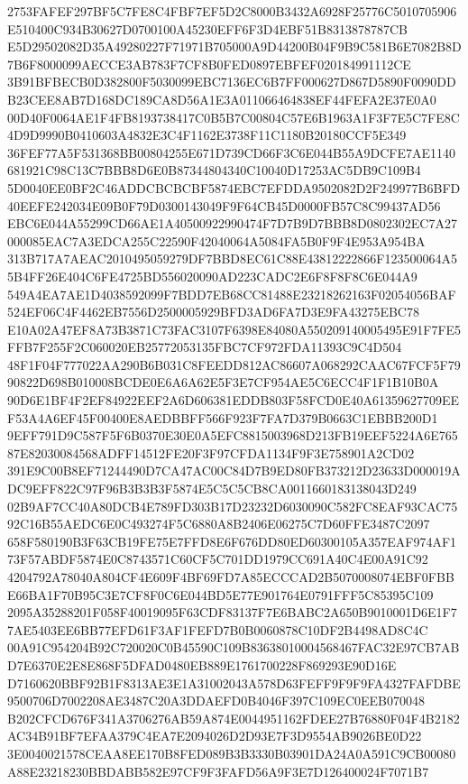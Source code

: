 \documentclass[UTF8,fontset=fandol,zihao=-4,a4paper]{ctexart}
\begin{document}
{{2753FAFEF297BF5C7FE8C4FBF7EF5D2C8000B3432A6928F25776C5010705906E510400C934B30627D0700100A45230EFF6F3D4EBF51B8313878787CB
E5D29502082D35A49280227F71971B705000A9D44200B04F9B9C581B6E7082B8D7B6F8000099AECCE3AB783F7CF8B0FED0897EBFEF020184991112CE
3B91BFBECB0D382800F5030099EBC7136EC6B7FF000627D867D5890F0090DDB23CEE8AB7D168DC189CA8D56A1E3A011066464838EF44FEFA2E37E0A0
00D40F0064AE1F4FB8193738417C0B5B7C00804C57E6B1963A1F3F7E5C7FE8C4D9D9990B0410603A4832E3C4F1162E3738F11C1180B20180CCF5E349
36FEF77A5F531368BB00804255E671D739CD66F3C6E044B55A9DCFE7AE1140681921C98C13C7BBB8D6E0B87344804340C10040D17253AC5DB9C109B4
5D0040EE0BF2C46ADDCBCBCBF5874EBC7EFDDA9502082D2F249977B6BFD40EEFE242034E09B0F79D0300143049F9F64CB45D0000FB57C8C99437AD56
EBC6E044A55299CD66AE1A40500922990474F7D7B9D7BBB8D0802302EC7A27000085EAC7A3EDCA255C22590F42040064A5084FA5B0F9F4E953A954BA
313B717A7AEAC2010495059279DF7BBD8EC61C88E43812222866F123500064A55B4FF26E404C6FE4725BD556020090AD223CADC2E6F8F8F8C6E044A9
549A4EA7AE1D4038592099F7BDD7EB68CC81488E23218262163F02054056BAF524EF06C4F4462EB7556D2500005929BFD3AD6FA7D3E9FA43275EBC78
E10A02A47EF8A73B3871C73FAC3107F6398E84080A550209140005495E91F7FE5FFB7F255F2C060020EB25772053135FBC7CF972FDA11393C9C4D504
48F1F04F777022AA290B6B031C8FEEDD812AC86607A068292CAAC67FCF5F7990822D698B010008BCDE0E6A6A62E5F3E7CF954AE5C6ECC4F1F1B10B0A
90D6E1BF4F2EF84922EEF2A6D606381EDDB803F58FCD0E40A61359627709EEF53A4A6EF45F00400E8AEDBBFF566F923F7FA7D379B0663C1EBBB200D1
9EFF791D9C587F5F6B0370E30E0A5EFC8815003968D213FB19EEF5224A6E76587E82030084568ADFF14512FE20F3F97CFDA1134F9F3E758901A2CD02
391E9C00B8EF71244490D7CA47AC00C84D7B9ED80FB373212D23633D000019ADC9EFF822C97F96B3B3B3F5874E5C5C5CB8CA0011660183138043D249
02B9AF7CC40A80DCB4E789FD303B17D23232D6030090C582FC8EAF93CAC7592C16B55AEDC6E0C493274F5C6880A8B2406E06275C7D60FFE3487C2097
658F580190B3F63CB19FE75E7FFD8E6F676DD80ED60300105A357EAF974AF173F57ABDF5874E0C8743571C60CF5C701DD1979CC691A40C4E00A91C92
4204792A78040A804CF4E609F4BF69FD7A85ECCCAD2B5070008074EBF0FBBE66BA1F70B95C3E7CF8F0C6E044BD5E77E901764E0791FFF5C85395C109
2095A35288201F058F40019095F63CDF83137F7E6BABC2A650B9010001D6E1F77AE5403EE6BB77EFD61F3AF1FEFD7B0B0060878C10DF2B4498AD8C4C
00A91C954204B92C720020C0B45590C109B83638010004568467FAC32E97CB7ABD7E6370E2E8E868F5DFAD0480EB889E1761700228F869293E90D16E
D7160620BBF92B1F8313AE3E1A31002043A578D63FEFF9F9F9FA4327FAFDBE9500706D7002208AE3487C20A3DDAEFD0B4046F397C109EC0EEB070048
B202CFCD676F341A3706276AB59A874E0044951162FDEE27B76880F04F4B2182AC34B91BF7EFAA379C4EA7E2094026D2D93E7F3D9554AB9026BE0D22
3E0040021578CEAA8EE170B8FED089B3B3330B03901DA24A0A591C9CB00080A88E23218230BBDABB582E97CF9F3FAFD56A9F3E7D126400024F7071B7
}}
\end{document}
